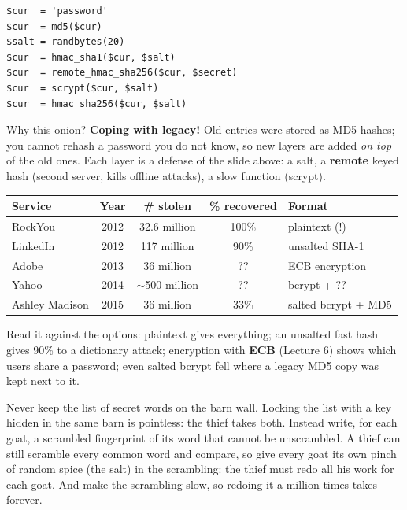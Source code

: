 \begin{exbox}[title={Facebook's password ``onion'' (source: T.\ Ristenpart)}]
\begin{center}
\begin{minipage}{0.6\linewidth}
\begin{lstlisting}[numbers=none, frame=none]
$cur  = 'password'
$cur  = md5($cur)
$salt = randbytes(20)
$cur  = hmac_sha1($cur, $salt)
$cur  = remote_hmac_sha256($cur, $secret)
$cur  = scrypt($cur, $salt)
$cur  = hmac_sha256($cur, $salt)
\end{lstlisting}
\end{minipage}
\end{center}
Why this onion? \textbf{Coping with legacy!} Old entries were stored as MD5 hashes; you cannot
rehash a password you do not know, so new layers are added \emph{on top} of the old ones. Each layer
is a defense of the slide above: a salt, a \textbf{remote} keyed hash (second server, kills offline
attacks), a slow function (scrypt).
\end{exbox}

\begin{exbox}[title={Password database compromises (source: T.\ Ristenpart)}]
\begin{center}
\small
\begin{tabular}{l|c|c|c|l}
\textbf{Service} & \textbf{Year} & \textbf{\# stolen} & \textbf{\% recovered} & \textbf{Format} \\ \hline
RockYou        & 2012 & 32.6 million & 100\% & plaintext (!) \\
LinkedIn       & 2012 & 117 million  & 90\%  & unsalted SHA-1 \\
Adobe          & 2013 & 36 million   & ??    & ECB encryption \\
Yahoo          & 2014 & $\sim$500 million & ?? & bcrypt + ?? \\
Ashley Madison & 2015 & 36 million   & 33\%  & salted bcrypt + MD5
\end{tabular}
\end{center}
Read it against the options: plaintext gives everything; an unsalted fast hash gives 90\% to a
dictionary attack; encryption with \textbf{ECB} (Lecture 6) shows which users share a password;
even salted bcrypt fell where a legacy MD5 copy was kept next to it.
\end{exbox}

\begin{goatbox}
Never keep the list of secret words on the barn wall. Locking the list with a key hidden in the
same barn is pointless: the thief takes both. Instead write, for each goat, a scrambled
fingerprint of its word that cannot be unscrambled. A thief can still scramble every common word
and compare, so give every goat its own pinch of random spice (the salt) in the scrambling: the
thief must redo all his work for each goat. And make the scrambling slow, so redoing it a million
times takes forever.
\end{goatbox}

